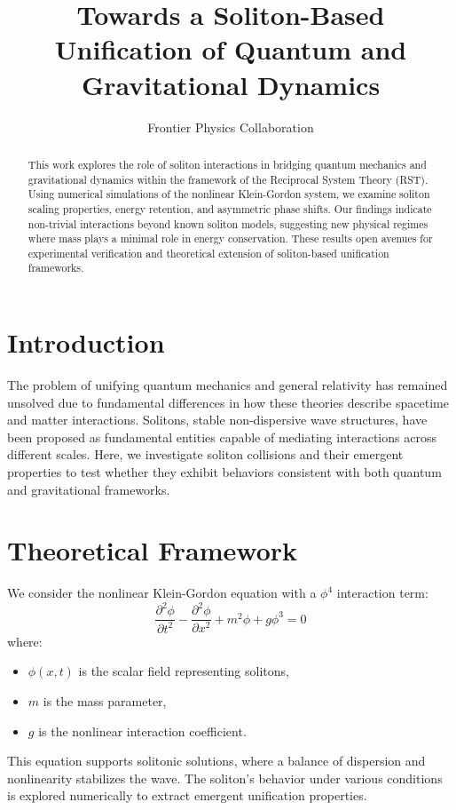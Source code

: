 \documentclass{article}
\title{Towards a Soliton-Based Unification of Quantum and Gravitational Dynamics}
\author{Frontier Physics Collaboration}
\date{}
\begin{document}
\maketitle

\begin{abstract}
This work explores the role of soliton interactions in bridging quantum mechanics and gravitational dynamics within the framework of the Reciprocal System Theory (RST). Using numerical simulations of the nonlinear Klein-Gordon system, we examine soliton scaling properties, energy retention, and asymmetric phase shifts. Our findings indicate non-trivial interactions beyond known soliton models, suggesting new physical regimes where mass plays a minimal role in energy conservation. These results open avenues for experimental verification and theoretical extension of soliton-based unification frameworks.
\end{abstract}

\section{Introduction}
The problem of unifying quantum mechanics and general relativity has remained unsolved due to fundamental differences in how these theories describe spacetime and matter interactions. Solitons, stable non-dispersive wave structures, have been proposed as fundamental entities capable of mediating interactions across different scales. Here, we investigate soliton collisions and their emergent properties to test whether they exhibit behaviors consistent with both quantum and gravitational frameworks.

\section{Theoretical Framework}
We consider the nonlinear Klein-Gordon equation with a $\phi^4$ interaction term:
\begin{equation}
\frac{\partial^2 \phi}{\partial t^2} - \frac{\partial^2 \phi}{\partial x^2} + m^2 \phi + g \phi^3 = 0
\end{equation}
where:
\begin{itemize}
    \item $\phi(x, t)$ is the scalar field representing solitons,
    \item $m$ is the mass parameter,
    \item $g$ is the nonlinear interaction coefficient.
\end{itemize}
This equation supports solitonic solutions, where a balance of dispersion and nonlinearity stabilizes the wave. The soliton's behavior under various conditions is explored numerically to extract emergent unification properties.
\end{document}
